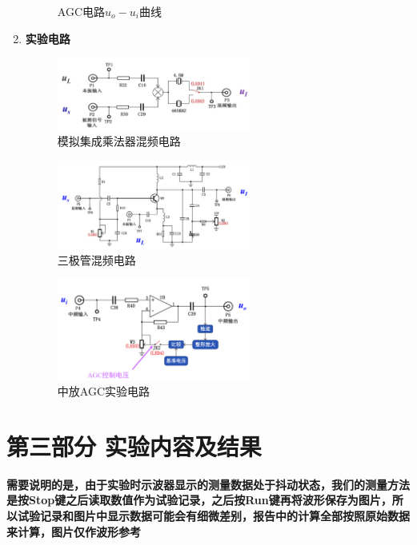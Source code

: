 \documentclass[UTF8]{ctexart}
\begin{document}
\begin{enumerate}
\begin{figure}[H]
        \caption{AGC电路$u_o-u_i$曲线}\label{fig:0.2}
    \end{figure}
    \item \textbf{实验电路}
    \begin{figure}[H]
        \centering
        \vspace{-2em}
        \includegraphics[width=0.6\textwidth]{pics/0.3.png}

        \caption{模拟集成乘法器混频电路}\label{fig:0.3}
    \end{figure}
    \begin{figure}[H]
        \centering
        \vspace{-2em}
        \includegraphics[width=0.6\textwidth]{pics/0.4.png}

        \caption{三极管混频电路}\label{fig:0.4}
    \end{figure}
    \begin{figure}[H]
        \centering
        \vspace{-2em}
        \includegraphics[width=0.6\textwidth]{pics/0.5.png}

        \caption{中放AGC实验电路}\label{fig:0.5}
    \end{figure}
\end{enumerate} 


\section{第三部分 \texorpdfstring{\quad}{} 实验内容及结果}
\textbf{需要说明的是，由于实验时示波器显示的测量数据处于抖动状态，我们的测量方法是按Stop键之后读取数值作为试验记录，之后按Run键再将波形保存为图片，所以试验记录和图片中显示数据可能会有细微差别，报告中的计算全部按照原始数据来计算，图片仅作波形参考}
\end{document}
